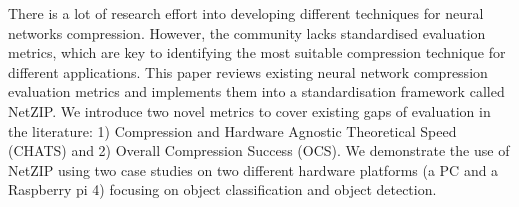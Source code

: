 There is a lot of research effort into developing different techniques for neural networks compression. However, the community lacks standardised evaluation metrics, which are key to identifying the most suitable compression technique for different applications. 
%
This paper reviews existing neural network compression evaluation metrics and implements them into a standardisation framework called NetZIP.%
%
We introduce two novel metrics to cover existing gaps of evaluation in the literature: 1) Compression and Hardware Agnostic Theoretical Speed (CHATS) and 2) Overall Compression Success (OCS).
%
We demonstrate the use of NetZIP using two case studies on two different hardware platforms (a PC and a Raspberry pi 4) focusing on object classification and object detection.